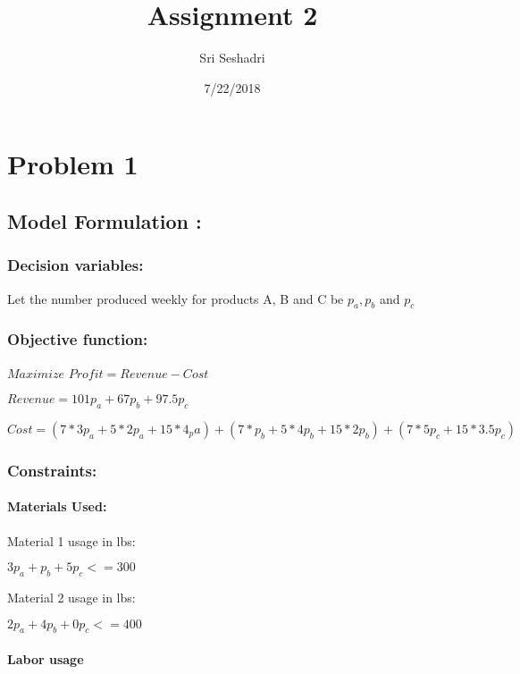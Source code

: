 \documentclass[]{article}
\title{Assignment 2}
\author{Sri Seshadri}
\date{7/22/2018}
\let\oldparagraph\paragraph
\renewcommand{\paragraph}[1]{\oldparagraph{#1}\mbox{}}
\begin{document}
\maketitle

\section{Problem 1}\label{problem-1}

\subsection{Model Formulation :}\label{model-formulation}

\subsubsection{Decision variables:}\label{decision-variables}

Let the number produced weekly for products A, B and C be
\(p_{a},p_{b}\) and \(p_{c}\)

\subsubsection{Objective function:}\label{objective-function}

\(Maximize\) \(Profit = Revenue - Cost\)

\(Revenue = 101p_{a} + 67p_{b} + 97.5p_{c}\)

\(Cost = (7*3p_{a} + 5*2p_{a} + 15*4_p{a}) + (7*p_{b} + 5*4p_{b} + 15*2p_{b}) + (7*5p_{c} + 15*3.5p_{c})\)

\subsubsection{Constraints:}\label{constraints}

\paragraph{Materials Used:}\label{materials-used}

Material 1 usage in lbs:

\(3p_{a} + p_{b} + 5p_{c} <= 300\)

Material 2 usage in lbs:

\(2p_{a} + 4p_{b} + 0p_{c} <= 400\)

\paragraph{Labor usage}\label{labor-usage}
\end{document}
